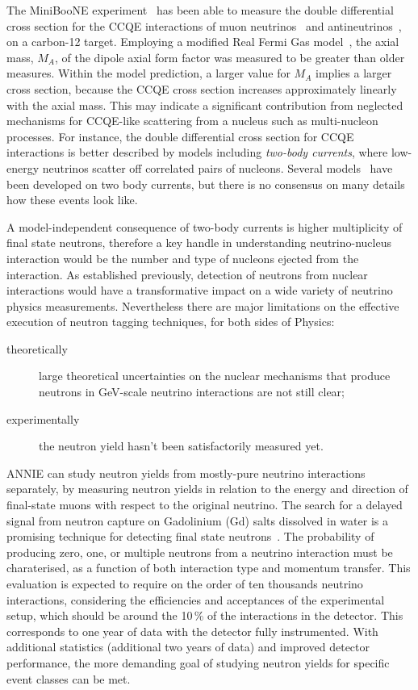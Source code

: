  The MiniBooNE experiment~\cite{Grange2014} has been able to measure the double differential %
 cross section for the CCQE interactions of muon neutrinos~\cite{Aguilar-Arevalo2010} and %
 antineutrinos~\cite{Aguilar-Arevalo2013}, on a carbon-12 target.
 Employing a modified Real Fermi Gas model~\cite{Smith1972}, the axial mass, $M_A$, of the dipole axial form factor %
 was measured to be greater than older measures.
 Within the model prediction, a larger value for $M_A$ implies a larger cross section, because the CCQE cross section %
 increases approximately linearly with the axial mass.
 This may indicate a significant contribution from neglected mechanisms for CCQE-like scattering %
 from a nucleus such as multi-nucleon processes.
 For instance, the double differential cross section for CCQE interactions is better described by models %
 including \emph{two-body currents}, where low-energy neutrinos scatter off correlated pairs of nucleons.
 Several models~\cite{Martini2010} have been developed on two body currents, %
 but there is no consensus on many details how these events look like.

 A model-independent consequence of two-body currents is higher multiplicity of final state neutrons, therefore %
 a key handle in understanding neutrino-nucleus interaction would be the number and type of nucleons %
 ejected from the interaction.
 As established previously, detection of neutrons from nuclear interactions %
 would have a transformative impact on a wide variety of neutrino physics measurements.
 Nevertheless there are major limitations on the effective execution of neutron tagging %
 techniques, for both sides of Physics:
 \begin{description}
   \item[theoretically] large theoretical uncertainties on the nuclear mechanisms that %
     produce neutrons in GeV-scale neutrino interactions are not still clear;
   \item[experimentally] the neutron yield hasn't been satisfactorily measured yet.
 \end{description}

 ANNIE can study neutron yields from mostly-pure neutrino interactions separately, %
 by measuring neutron yields in relation to the energy and direction of final-state muons
 with respect to the original neutrino. 
 The search for a delayed signal from neutron capture on Gadolinium (Gd) salts dissolved in water %
 is a promising technique for detecting final state neutrons~\cite{Ishino2009}.
 The probability of producing zero, one, or multiple neutrons from a neutrino interaction must be charaterised, %
 as a function of both interaction type and momentum transfer.
 This evaluation is expected to require on the order of ten thousands neutrino interactions, considering %
 the efficiencies and acceptances of the experimental setup, which should be around the 10\,\% of the interactions %
 in the detector. 
 This corresponds to one year of data with the detector fully instrumented.
 With additional statistics (additional two years of data) and improved detector performance, %
 the more demanding goal of studying neutron yields for specific event classes can be met.

